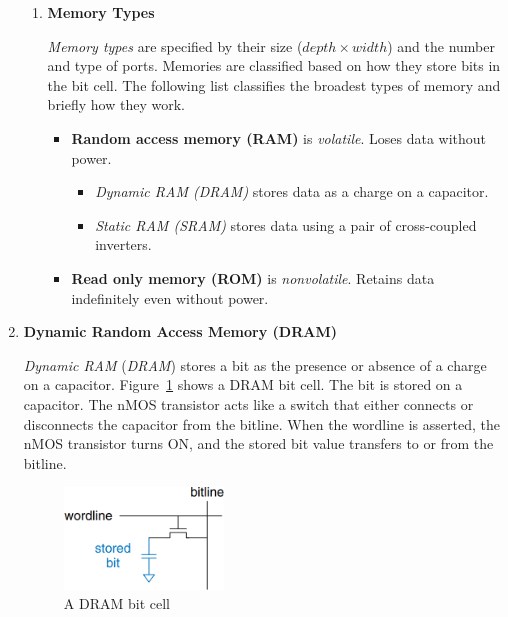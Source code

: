 \documentclass[12pt]{article}
\numberwithin{figure}{subsection}
\numberwithin{table}{subsection}
\numberwithin{equation}{subsection}
\begin{document}
\begin{enumerate}
\begin{enumerate}
    \item \textbf{Memory Types}

    \textit{Memory types} are specified by their size ($depth \times width$) and the number and type of ports. Memories are classified based on how they store bits in the bit cell. The following list classifies the broadest types of memory and briefly how they work.

    \begin{itemize}
      \item \textbf{Random access memory (RAM)} is \textit{volatile}. Loses data without power.
        \begin{itemize}
          \item \textit{Dynamic RAM (DRAM)} stores data as a charge on a capacitor.
          \item \textit{Static RAM (SRAM)} stores data using a pair of cross-coupled inverters.
        \end{itemize}
      \item \textbf{Read only memory (ROM)} is \textit{nonvolatile}. Retains data indefinitely even without power.
    \end{itemize}
  \end{enumerate}

  \item \textbf{Dynamic Random Access Memory (DRAM)}

  \textit{Dynamic RAM} (\textit{DRAM}) stores a bit as the presence or absence of a charge on a capacitor. Figure~\ref{fig:dram_bit_cell} shows a DRAM bit cell. The bit is stored on a capacitor. The nMOS transistor acts like a switch that either connects or disconnects the capacitor from the bitline. When the wordline is asserted, the nMOS transistor turns ON, and the stored bit value transfers to or from the bitline.

  \begin{figure}[ht]
    \centering
    \includegraphics[width=0.4\textwidth]{dram_bit_cell.png}
    \caption{A DRAM bit cell}
    \label{fig:dram_bit_cell}
  \end{figure}


\end{enumerate}
\end{document}
